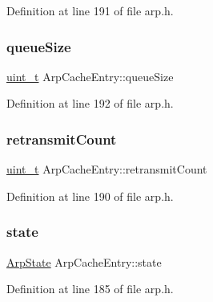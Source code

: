 Definition at line 191 of file arp.\+h.

\mbox{\label{structArpCacheEntry_af81948c9f899549e51e70c2550f4ae4f}} 
\subsubsection{\texorpdfstring{queue\+Size}{queueSize}}
{\footnotesize\ttfamily \hyperlink{compiler__port_8h_a12a1e9b3ce141648783a82445d02b58d}{uint\+\_\+t} Arp\+Cache\+Entry\+::queue\+Size}



Definition at line 192 of file arp.\+h.

\mbox{\label{structArpCacheEntry_a94ca6d58bf237b77eec4419fceac39ab}} 
\subsubsection{\texorpdfstring{retransmit\+Count}{retransmitCount}}
{\footnotesize\ttfamily \hyperlink{compiler__port_8h_a12a1e9b3ce141648783a82445d02b58d}{uint\+\_\+t} Arp\+Cache\+Entry\+::retransmit\+Count}



Definition at line 190 of file arp.\+h.

\mbox{\label{structArpCacheEntry_aa0bba797a4db6b52cebcd868d52e6361}} 
\subsubsection{\texorpdfstring{state}{state}}
{\footnotesize\ttfamily \hyperlink{arp_8h_a9beda55edee387702e47f03bb204deb5}{Arp\+State} Arp\+Cache\+Entry\+::state}



Definition at line 185 of file arp.\+h.

\mbox{\label{structArpCacheEntry_ad74ee2386d4551701aa641e9111c4df0}} 
